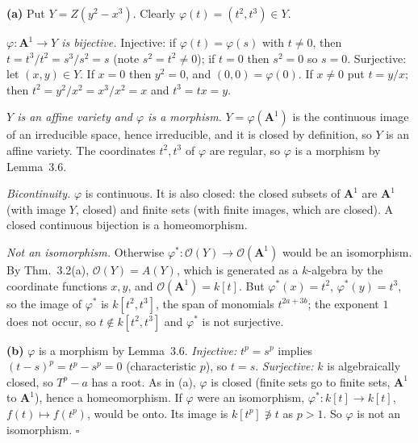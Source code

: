 \documentclass[11pt]{article}
\begin{document}
\pf
\textbf{(a)} Put $Y=Z(y^2-x^3)$. Clearly $\varphi(t)=(t^2,t^3)\in Y$.

\emph{$\varphi:\mathbf A^1\to Y$ is bijective.} Injective: if $\varphi(t)=\varphi(s)$ with $t\ne0$, then $t=t^3/t^2=s^3/s^2=s$ (note $s^2=t^2\neq0$); if $t=0$ then $s^2=0$ so $s=0$. Surjective: let $(x,y)\in Y$. If $x=0$ then $y^2=0$, and $(0,0)=\varphi(0)$. If $x\ne0$ put $t=y/x$; then $t^2=y^2/x^2=x^3/x^2=x$ and $t^3=tx=y$.

\emph{$Y$ is an affine variety and $\varphi$ is a morphism.} $Y=\varphi(\mathbf A^1)$ is the continuous image of an irreducible space, hence irreducible, and it is closed by definition, so $Y$ is an affine variety. The coordinates $t^2,t^3$ of $\varphi$ are regular, so $\varphi$ is a morphism by Lemma~3.6.

\emph{Bicontinuity.} $\varphi$ is continuous. It is also closed: the closed subsets of $\mathbf A^1$ are $\mathbf A^1$ (with image $Y$, closed) and finite sets (with finite images, which are closed). A closed continuous bijection is a homeomorphism.

\emph{Not an isomorphism.} Otherwise $\varphi^*:\mathcal O(Y)\to\mathcal O(\mathbf A^1)$ would be an isomorphism. By Thm.~3.2(a), $\mathcal O(Y)=A(Y)$, which is generated as a $k$-algebra by the coordinate functions $x,y$, and $\mathcal O(\mathbf A^1)=k[t]$. But $\varphi^*(x)=t^2$, $\varphi^*(y)=t^3$, so the image of $\varphi^*$ is $k[t^2,t^3]$, the span of monomials $t^{2a+3b}$; the exponent $1$ does not occur, so $t\notin k[t^2,t^3]$ and $\varphi^*$ is not surjective.

\textbf{(b)} $\varphi$ is a morphism by Lemma~3.6. \emph{Injective:} $t^p=s^p$ implies $(t-s)^p=t^p-s^p=0$ (characteristic $p$), so $t=s$. \emph{Surjective:} $k$ is algebraically closed, so $T^p-a$ has a root. As in (a), $\varphi$ is closed (finite sets go to finite sets, $\mathbf A^1$ to $\mathbf A^1$), hence a homeomorphism. If $\varphi$ were an isomorphism, $\varphi^*:k[t]\to k[t]$, $f(t)\mapsto f(t^p)$, would be onto. Its image is $k[t^p]\not\ni t$ as $p>1$. So $\varphi$ is not an isomorphism. \hfill$\square$
\end{document}
